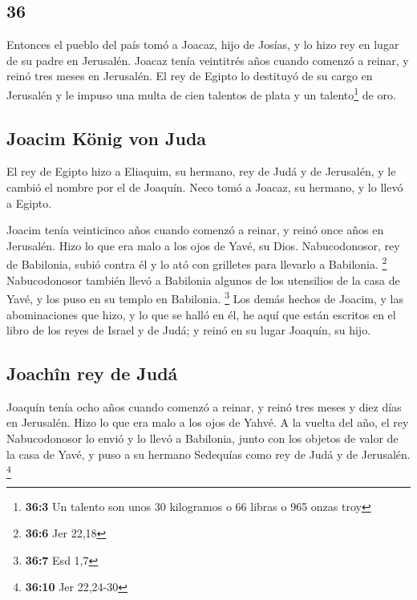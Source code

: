 \begin{paracol}{2}
\hypertarget{section-70}{%
\section{36}\label{section-70}}

 Entonces el pueblo del país tomó a Joacaz, hijo de
Josías, y lo hizo rey en lugar de su padre en Jerusalén. 
Joacaz tenía veintitrés años cuando comenzó a reinar, y reinó tres meses
en Jerusalén.  El rey de Egipto lo destituyó de su cargo
en Jerusalén y le impuso una multa de cien talentos de plata y un
talento\footnote{\textbf{36:3} Un talento son unos 30 kilogramos o 66
  libras o 965 onzas troy} de oro.

\hypertarget{joacim-kuxf6nig-von-juda}{%
\subsection{Joacim König von Juda}\label{joacim-kuxf6nig-von-juda}}

 El rey de Egipto hizo a Eliaquim, su hermano, rey de Judá
y de Jerusalén, y le cambió el nombre por el de Joaquín. Neco tomó a
Joacaz, su hermano, y lo llevó a Egipto.

 Joacim tenía veinticinco años cuando comenzó a reinar, y
reinó once años en Jerusalén. Hizo lo que era malo a los ojos de Yavé,
su Dios.  Nabucodonosor, rey de Babilonia, subió contra él
y lo ató con grilletes para llevarlo a Babilonia. \footnote{\textbf{36:6}
  Jer 22,18}  Nabucodonosor también llevó a Babilonia
algunos de los utensilios de la casa de Yavé, y los puso en su templo en
Babilonia. \footnote{\textbf{36:7} Esd 1,7}  Los demás
hechos de Joacim, y las abominaciones que hizo, y lo que se halló en él,
he aquí que están escritos en el libro de los reyes de Israel y de Judá;
y reinó en su lugar Joaquín, su hijo.

\hypertarget{joachuxeen-rey-de-juduxe1}{%
\subsection{Joachîn rey de Judá}\label{joachuxeen-rey-de-juduxe1}}

 Joaquín tenía ocho años cuando comenzó a reinar, y reinó
tres meses y diez días en Jerusalén. Hizo lo que era malo a los ojos de
Yahvé.  A la vuelta del año, el rey Nabucodonosor lo
envió y lo llevó a Babilonia, junto con los objetos de valor de la casa
de Yavé, y puso a su hermano Sedequías como rey de Judá y de Jerusalén.
\footnote{\textbf{36:10} Jer 22,24-30}


\end{paracol}
